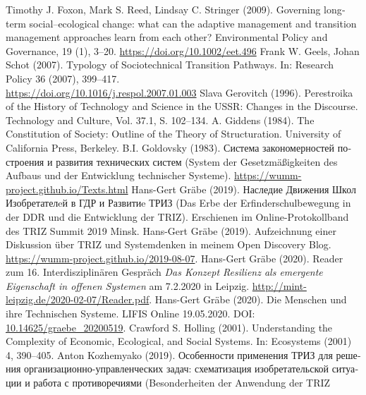 \documentclass[12pt,a4paper]{article}
\begin{document}
\begin{thebibliography}{xxx}
 Timothy J. Foxon, Mark S. Reed, Lindsay C. Stringer
  (2009). Governing long‐term social–ecological change: what can the adaptive
  management and transition management approaches learn from each other?
  Environmental Policy and Governance, 19 (1),
  3--20. \url{https://doi.org/10.1002/eet.496}
 Frank W. Geels, Johan Schot (2007).  Typology of
  Sociotechnical Transition Pathways. In: Research Policy 36 (2007),
  399–417.\\ \url{https://doi.org/10.1016/j.respol.2007.01.003}
 Slava Gerovitch (1996). Perestroika of the History of
  Technology and Science in the USSR: Changes in the Discourse. Technology and
  Culture, Vol. 37.1, S. 102--134.
 A. Giddens (1984). The Constitution of Society: Outline
  of the Theory of Structuration. University of California Press, Berkeley.
 B.I. Goldovsky (1983).
  \foreignlanguage{russian}{Система закономерностей построения и развития
    технических систем} (System der Gesetzmäßigkeiten des Aufbaus und der
  Entwicklung technischer Systeme).
  \url{https://wumm-project.github.io/Texts.html}
 Hans-Gert Gräbe (2019).
  \foreignlanguage{russian}{Наследие Движения Школ Изобретателeй в ГДР и
    Развитиe ТРИЗ} (Das Erbe der Erfinderschulbewegung in der DDR und die
  Entwicklung der TRIZ). Erschienen im Online-Protokollband des TRIZ Summit
  2019 Minsk.
 Hans-Gert Gräbe (2019).  Aufzeichnung einer Diskussion
  über TRIZ und Systemdenken in meinem Open Discovery Blog.\\
  \url{https://wumm-project.github.io/2019-08-07}.
 Hans-Gert Gräbe (2020). Reader zum
  16. Interdisziplinären Gespräch \emph{Das Konzept Resilienz als emergente
    Eigenschaft in offenen Systemen} am 7.2.2020 in Leipzig.
  \url{http://mint-leipzig.de/2020-02-07/Reader.pdf}.
 Hans-Gert Gräbe (2020). Die Menschen und ihre
  Technischen Systeme.  LIFIS Online 19.05.2020.  DOI:
  \url{10.14625/graebe_20200519}.
 Crawford S. Holling (2001). Understanding the Complexity
  of Economic, Ecological, and Social Systems. In: Ecosystems (2001) 4,
  390–405.
 Anton Kozhemyako (2019).
  \foreignlanguage{russian}{Особенности применения ТРИЗ для решения
    органи\-зационно-управленческих задач: схематизация изобретательской
    ситуации и работа с противоречиями} (Besonderheiten der Anwendung der TRIZ

\end{thebibliography}
\end{document}
